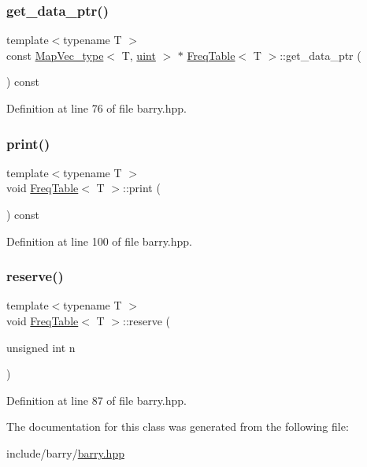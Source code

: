 \subsubsection{\texorpdfstring{get\+\_\+data\+\_\+ptr()}{get\_data\_ptr()}}
{\footnotesize\ttfamily template$<$typename T $>$ \\
const \hyperlink{namespacebarry_a2f0d3aab1d67e4c8eaeab9022e16139f}{Map\+Vec\+\_\+type}$<$ T, \hyperlink{namespacebarry_a11dfc53ddb4672278319aa04f1e09a6c}{uint} $>$ $\ast$ \hyperlink{classbarry_1_1_freq_table}{Freq\+Table}$<$ T $>$\+::get\+\_\+data\+\_\+ptr (\begin{DoxyParamCaption}{ }\end{DoxyParamCaption}) const\hspace{0.3cm}{\ttfamily [inline]}}



Definition at line 76 of file barry.\+hpp.

\mbox{\label{classbarry_1_1_freq_table_a4fe8f5e3b5bf64a1cbaf99deb96298d4}} 
\subsubsection{\texorpdfstring{print()}{print()}}
{\footnotesize\ttfamily template$<$typename T $>$ \\
void \hyperlink{classbarry_1_1_freq_table}{Freq\+Table}$<$ T $>$\+::print (\begin{DoxyParamCaption}{ }\end{DoxyParamCaption}) const\hspace{0.3cm}{\ttfamily [inline]}}



Definition at line 100 of file barry.\+hpp.

\mbox{\label{classbarry_1_1_freq_table_a0bdced25f7c0bee38e073c4654578d19}} 
\subsubsection{\texorpdfstring{reserve()}{reserve()}}
{\footnotesize\ttfamily template$<$typename T $>$ \\
void \hyperlink{classbarry_1_1_freq_table}{Freq\+Table}$<$ T $>$\+::reserve (\begin{DoxyParamCaption}\item[{unsigned int}]{n }\end{DoxyParamCaption})\hspace{0.3cm}{\ttfamily [inline]}}



Definition at line 87 of file barry.\+hpp.



The documentation for this class was generated from the following file\+:\begin{DoxyCompactItemize}
\item 
include/barry/\hyperlink{barry_8hpp}{barry.\+hpp}\end{DoxyCompactItemize}
